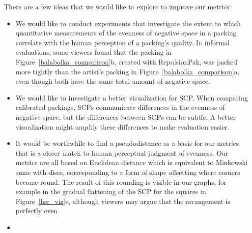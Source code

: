\nnewtext
{
There are a few ideas that we would like to explore to improve our metrics:}
\begin{itemize}
\item We would like to conduct experiments that investigate the
extent to which quantitative measurements of the evenness of negative
space in a packing correlate with the human perception of a
packing's quality.  In informal evaluations, some viewers found that
the packing in Figure~\ref{balabolka_comparison}b, created with RepulsionPak,
was packed more tightly than the artist's packing in
Figure~\ref{balabolka_comparison}a, even though both have the same total
amount of negative space.

\item We would like to investigate a better visualization for SCP.
When comparing calibrated packings, SCPs communicate 
differences in the evenness of negative space, but the differences 
between SCPs can be subtle.  A better visualization
might amplify these differences to make evaluation easier.

\item It would be worthwhile to find a pseudodistance as a basis for our metrics
that is a closer match to human perceptual judgment of evenness.
Our metrics are all based on Euclidean distance which is
equivalent to Minkowski sums with discs, 
corresponding to a form of shape offsetting
where corners become round.
The result of this rounding is visible in
our graphs, for example in the gradual flattening of the SCP for
the squares in Figure~\ref{hsr_viz}e, although viewers may argue that
the arrangement is perfectly even.

\item {}
\end{itemize}



